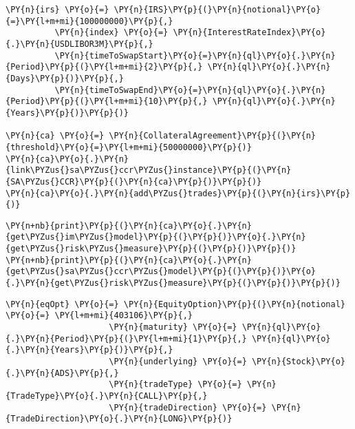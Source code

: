     \begin{tcolorbox}[breakable, size=fbox, boxrule=1pt, pad at break*=1mm,colback=cellbackground, colframe=cellborder]
\begin{Verbatim}[commandchars=\\\{\}]
\PY{n}{irs} \PY{o}{=} \PY{n}{IRS}\PY{p}{(}\PY{n}{notional}\PY{o}{=}\PY{l+m+mi}{100000000}\PY{p}{,}
          \PY{n}{index} \PY{o}{=} \PY{n}{InterestRateIndex}\PY{o}{.}\PY{n}{USDLIBOR3M}\PY{p}{,}
          \PY{n}{timeToSwapStart}\PY{o}{=}\PY{n}{ql}\PY{o}{.}\PY{n}{Period}\PY{p}{(}\PY{l+m+mi}{2}\PY{p}{,} \PY{n}{ql}\PY{o}{.}\PY{n}{Days}\PY{p}{)}\PY{p}{,}
          \PY{n}{timeToSwapEnd}\PY{o}{=}\PY{n}{ql}\PY{o}{.}\PY{n}{Period}\PY{p}{(}\PY{l+m+mi}{10}\PY{p}{,} \PY{n}{ql}\PY{o}{.}\PY{n}{Years}\PY{p}{)}\PY{p}{)}

\PY{n}{ca} \PY{o}{=} \PY{n}{CollateralAgreement}\PY{p}{(}\PY{n}{threshold}\PY{o}{=}\PY{l+m+mi}{50000000}\PY{p}{)}
\PY{n}{ca}\PY{o}{.}\PY{n}{link\PYZus{}sa\PYZus{}ccr\PYZus{}instance}\PY{p}{(}\PY{n}{SA\PYZus{}CCR}\PY{p}{(}\PY{n}{ca}\PY{p}{)}\PY{p}{)}
\PY{n}{ca}\PY{o}{.}\PY{n}{add\PYZus{}trades}\PY{p}{(}\PY{n}{irs}\PY{p}{)}
\end{Verbatim}
\end{tcolorbox}

    \begin{tcolorbox}[breakable, size=fbox, boxrule=1pt, pad at break*=1mm,colback=cellbackground, colframe=cellborder]
\begin{Verbatim}[commandchars=\\\{\}]
\PY{n+nb}{print}\PY{p}{(}\PY{n}{ca}\PY{o}{.}\PY{n}{get\PYZus{}im\PYZus{}model}\PY{p}{(}\PY{p}{)}\PY{o}{.}\PY{n}{get\PYZus{}risk\PYZus{}measure}\PY{p}{(}\PY{p}{)}\PY{p}{)}
\PY{n+nb}{print}\PY{p}{(}\PY{n}{ca}\PY{o}{.}\PY{n}{get\PYZus{}sa\PYZus{}ccr\PYZus{}model}\PY{p}{(}\PY{p}{)}\PY{o}{.}\PY{n}{get\PYZus{}risk\PYZus{}measure}\PY{p}{(}\PY{p}{)}\PY{p}{)}
\end{Verbatim}
\end{tcolorbox}

    \begin{tcolorbox}[breakable, size=fbox, boxrule=1pt, pad at break*=1mm,colback=cellbackground, colframe=cellborder]
\begin{Verbatim}[commandchars=\\\{\}]
\PY{n}{eqOpt} \PY{o}{=} \PY{n}{EquityOption}\PY{p}{(}\PY{n}{notional} \PY{o}{=} \PY{l+m+mi}{403106}\PY{p}{,}
                     \PY{n}{maturity} \PY{o}{=} \PY{n}{ql}\PY{o}{.}\PY{n}{Period}\PY{p}{(}\PY{l+m+mi}{1}\PY{p}{,} \PY{n}{ql}\PY{o}{.}\PY{n}{Years}\PY{p}{)}\PY{p}{,}
                     \PY{n}{underlying} \PY{o}{=} \PY{n}{Stock}\PY{o}{.}\PY{n}{ADS}\PY{p}{,}
                     \PY{n}{tradeType} \PY{o}{=} \PY{n}{TradeType}\PY{o}{.}\PY{n}{CALL}\PY{p}{,}
                     \PY{n}{tradeDirection} \PY{o}{=} \PY{n}{TradeDirection}\PY{o}{.}\PY{n}{LONG}\PY{p}{)}
\end{Verbatim}
\end{tcolorbox}

